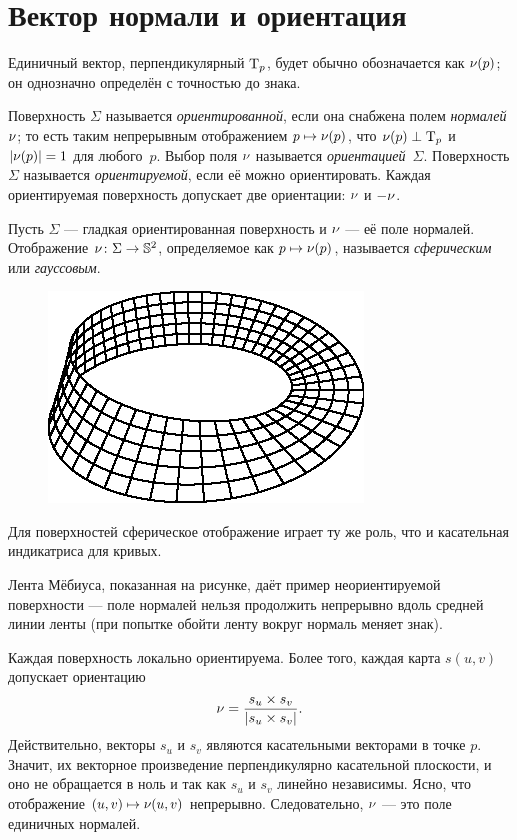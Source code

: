  \section{Вектор нормали и ориентация}
 
Единичный вектор, перпендикулярный $\mathrm{T}_p$, будет обычно обозначается как $\nu(p)$;
он однозначно определён с точностью до знака.

Поверхность $\Sigma$ называется \emph{ориентированной}, если она снабжена полем  \emph{нормалей} $\nu$;
то есть таким непрерывным отображением $p\mapsto \nu(p)$, что $\nu(p)\perp\mathrm{T}_p$ и $|\nu(p)|=1$ для любого~$p$.
Выбор поля $\nu$ называется {}\emph{ориентацией}~$\Sigma$.
Поверхность $\Sigma$ называется {}\emph{ориентируемой}, если её можно ориентировать.
Каждая ориентируемая поверхность допускает две ориентации: $\nu$ и $-\nu$.

Пусть $\Sigma$ --- гладкая ориентированная поверхность и $\nu$ --- её поле нормалей.
Отображение $\nu\colon\Sigma\to \mathbb{S}^2$, определяемое как $p\mapsto \nu(p)$, называется \emph{сферическим} или \emph{гауссовым}.

\begin{figure}
\vskip-7mm
\centering
\includegraphics{asy/moebius}
\vskip-1mm
\end{figure}

Для поверхностей сферическое отображение играет ту же роль, что и касательная индикатриса для кривых.

Лента Мёбиуса, показанная на рисунке, даёт пример неориентируемой поверхности --- поле нормалей нельзя продолжить непрерывно вдоль средней линии ленты (при попытке обойти ленту вокруг нормаль меняет знак).

Каждая поверхность локально ориентируема.
Более того, каждая карта $s(u,v)$ допускает ориентацию 
\[\nu=
\frac{s_u\times s_v}
{\left|s_u\times s_v\right|}.\]
Действительно, векторы $s_u$ и $s_v$ являются касательными векторами в точке $p$.
Значит, их векторное произведение перпендикулярно касательной плоскости,
и оно не обращается в ноль
и так как $s_u$ и $s_v$ линейно независимы.
Ясно, что отображение $(u,v)\mapsto \nu(u,v)$ непрерывно.
Следовательно, $\nu$ --- это поле единичных нормалей.

